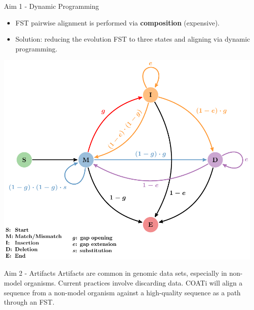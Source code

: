 \documentclass{beamer}
\begin{document}
\begin{frame}{Aim 1 - Dynamic Programming} %
\vspace{1em}
\begin{itemize}
	\item FST pairwise alignment is performed via \textbf{composition}
		(expensive).
	\item Solution: reducing the evolution FST to three states and aligning via
		dynamic programming.
\end{itemize}
\vspace{-0.75em}
\includegraphics[scale=0.5,center]{fig-dp-model.pdf}
\end{frame} %

\begin{frame}{Aim 2 - Artifacts} %
\justify
Artifacts are common in genomic data sets, especially in non-model organisms.
Current practices involve discarding data.
COATi will align a sequence from a non-model organism against a high-quality
sequence as a path through an FST.
\end{frame} %
\end{document}
